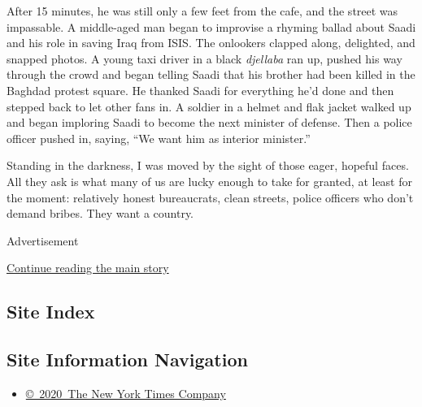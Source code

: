 After 15 minutes, he was still only a few feet from the cafe, and the
street was impassable. A middle-aged man began to improvise a rhyming
ballad about Saadi and his role in saving Iraq from ISIS. The onlookers
clapped along, delighted, and snapped photos. A young taxi driver in a
black \emph{djellaba} ran up, pushed his way through the crowd and began
telling Saadi that his brother had been killed in the Baghdad protest
square. He thanked Saadi for everything he'd done and then stepped back
to let other fans in. A soldier in a helmet and flak jacket walked up
and began imploring Saadi to become the next minister of defense. Then a
police officer pushed in, saying, ``We want him as interior minister.''

Standing in the darkness, I was moved by the sight of those eager,
hopeful faces. All they ask is what many of us are lucky enough to take
for granted, at least for the moment: relatively honest bureaucrats,
clean streets, police officers who don't demand bribes. They want a
country.

Advertisement

\protect\hyperlink{after-bottom}{Continue reading the main story}

\hypertarget{site-index}{%
\subsection{Site Index}\label{site-index}}

\hypertarget{site-information-navigation}{%
\subsection{Site Information
Navigation}\label{site-information-navigation}}

\begin{itemize}
\tightlist
\item
  \href{https://help.nytimes.com/hc/en-us/articles/115014792127-Copyright-notice}{©~2020~The
  New York Times Company}
\end{itemize}

